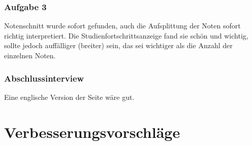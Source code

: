 \documentclass[a4paper,10pt]{scrartcl}
\begin{document}
\subsubsection*{Aufgabe 3}

Notenschnitt wurde sofort gefunden, auch die Aufsplittung der Noten sofort richtig interpretiert. Die Studienfortschrittsanzeige fand sie schön und wichtig, sollte jedoch auffälliger (breiter) sein, das sei wichtiger als die Anzahl der einzelnen Noten.

\subsubsection*{Abschlussinterview}

Eine englische Version der Seite wäre gut.






\section{Verbesserungsvorschläge}
\end{document}
